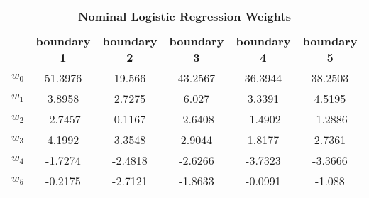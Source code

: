 \appendix
\chapter{}

\childFeatures
\socioFeatures

\socioROC

\begin{table}[h]
\begin{tabular}{cccccc}
\multicolumn{6}{c}{\textbf{Nominal Logistic Regression Weights}} \\
\multicolumn{1}{l}{} & \multicolumn{1}{l}{} & \multicolumn{1}{l}{} & \multicolumn{1}{l}{} & \multicolumn{1}{l}{} & \multicolumn{1}{l}{} \\ \cline{2-6} 
\multicolumn{1}{c|}{} & \multicolumn{1}{c|}{\textbf{boundary 1}} & \multicolumn{1}{c|}{\textbf{boundary 2}} & \multicolumn{1}{c|}{\textbf{boundary 3}} & \multicolumn{1}{c|}{\textbf{boundary 4}} & \multicolumn{1}{c|}{\textbf{boundary 5}} \\ \hline
\multicolumn{1}{|c|}{\textbf{$w_0$}} & \multicolumn{1}{c|}{51.3976} & \multicolumn{1}{c|}{19.566} & \multicolumn{1}{c|}{43.2567} & \multicolumn{1}{c|}{36.3944} & \multicolumn{1}{c|}{38.2503} \\ \hline
\multicolumn{1}{|c|}{\textbf{$w_1$}} & \multicolumn{1}{c|}{3.8958} & \multicolumn{1}{c|}{2.7275} & \multicolumn{1}{c|}{6.027} & \multicolumn{1}{c|}{3.3391} & \multicolumn{1}{c|}{4.5195} \\ \hline
\multicolumn{1}{|c|}{\textbf{$w_2$}} & \multicolumn{1}{c|}{-2.7457} & \multicolumn{1}{c|}{0.1167} & \multicolumn{1}{c|}{-2.6408} & \multicolumn{1}{c|}{-1.4902} & \multicolumn{1}{c|}{-1.2886} \\ \hline
\multicolumn{1}{|c|}{\textbf{$w_3$}} & \multicolumn{1}{c|}{4.1992} & \multicolumn{1}{c|}{3.3548} & \multicolumn{1}{c|}{2.9044} & \multicolumn{1}{c|}{1.8177} & \multicolumn{1}{c|}{2.7361} \\ \hline
\multicolumn{1}{|c|}{\textbf{$w_4$}} & \multicolumn{1}{c|}{-1.7274} & \multicolumn{1}{c|}{-2.4818} & \multicolumn{1}{c|}{-2.6266} & \multicolumn{1}{c|}{-3.7323} & \multicolumn{1}{c|}{-3.3666} \\ \hline
\multicolumn{1}{|c|}{\textbf{$w_5$}} & \multicolumn{1}{c|}{-0.2175} & \multicolumn{1}{c|}{-2.7121} & \multicolumn{1}{c|}{-1.8633} & \multicolumn{1}{c|}{-0.0991} & \multicolumn{1}{c|}{-1.088} \\ \hline

\end{tabular}
\end{table}
